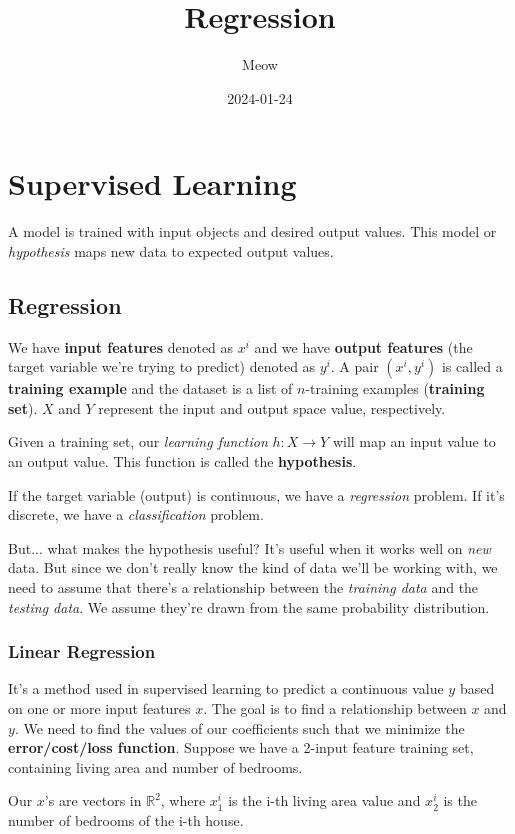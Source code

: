 \documentclass{book}
\title{\textbf{Regression}}
\author{Meow}
\date{2024-01-24}
\begin{document}
\maketitle

\chapter{Supervised Learning}
A model is trained with input objects and desired output values. This model or \textit{hypothesis} maps new data to expected output values.

\section{Regression}
We have \textbf{input features} denoted as $x^i$ and we have \textbf{output features} (the target variable we're trying to predict) denoted as $y^i$. A pair $(x^i, y^i)$ is called a \textbf{training example} and the dataset is a list of $n$-training examples (\textbf{training set}). $X$ and $Y$ represent the input and output space value, respectively.

Given a training set, our \textit{learning function} $h: X \rightarrow Y$ will map an input value to an output value. This function is called the \textbf{hypothesis}.

If the target variable (output) is continuous, we have a \textit{regression} problem. If it's discrete, we have a \textit{classification} problem.

But... what makes the hypothesis useful? It's useful when it works well on \textit{new} data. But since we don't really know the kind of data we'll be working with, we need to assume that there's a relationship between the \textit{training data} and the \textit{testing data}. We assume they're drawn from the same probability distribution.

\subsection{Linear Regression}
It's a method used in supervised learning to predict a continuous value $y$ based on one or more input features $x$. The goal is to find a relationship between $x$ and $y$. We need to find the values of our coefficients such that we minimize the \textbf{error/cost/loss function}. Suppose we have a 2-input feature training set, containing living area and number of bedrooms.

Our $x$'s are vectors in $\mathbb{R}^2$, where $x_1^i$ is the i-th living area value and $x_2^i$ is the number of bedrooms of the i-th house.
\end{document}
